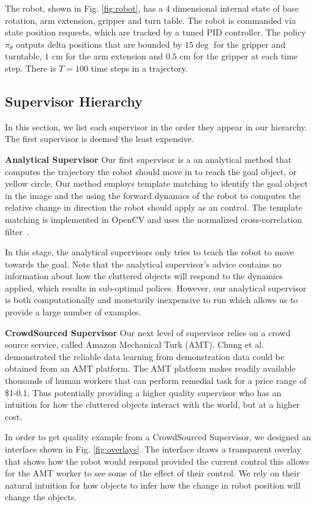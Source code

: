 \documentclass[10pt, conference]{ieeeconf}      %
\begin{document}
The robot, shown in Fig. \ref{fig:robot}, has a 4 dimensional internal state of base rotation, arm extension, gripper and turn table. The robot is commanded via state position requests, which are tracked by a tuned PID controller. The policy $\pi_\theta$ outputs delta positions that are bounded by $15\deg$ for the gripper and turntable, $1$ cm for the arm extension and $0.5$ cm for the gripper at each time step. There is $T=100$ time steps in a trajectory. 



\subsection{Supervisor Hierarchy}
In this section, we list each supervisor in the order they appear in our hierarchy. The first supervisor is deemed the least expensive. 

\noindent \textbf{Analytical Supervisor} Our first supervisor is a an analytical method that computes the trajectory the robot should move in to reach the goal object, or yellow circle. Our method employs template matching to identify the goal object in the image and the using the forward dynamics of the robot to computes the relative change in direction the robot should apply as an control. The template matching is implemented in OpenCV and uses the normalized cross-correlation filter~\cite{opencv_library}.

In this stage, the analytical supervisors only tries to teach the robot to move towards the goal. Note that the analytical supervisor's advice contains no information about how the cluttered objects will respond to the dynamics applied, which results in sub-optimal polices. However, our analytical supervisor is both computationally and monetarily inexpensive to run which allows us to provide a large number of examples. 


\noindent \textbf{CrowdSourced Supervisor} Our next level of supervisor relies on a crowd source service, called Amazon Mechanical Turk (AMT). Chung et al. demonstrated the reliable data learning from demonstration data could be obtained from an AMT platform. The AMT platform makes readily available thousands of human workers that can perform remedial task for a price range of \$1-0.1\cite{chung2014accelerating}. Thus potentially providing a higher quality supervisor who has an intuition for how the cluttered objects interact with the world, but at a higher cost. 

In order to get quality example from a CrowdSourced Supervisor, we designed an interface shown in Fig. \ref{fig:overlays}. The interface draws a transparent overlay that shows how the robot would respond provided the current control this allows for the AMT worker to see some of the effect of their control. We rely on their natural intuition for how objects to infer how the change in robot position will change the objects.
\end{document}

